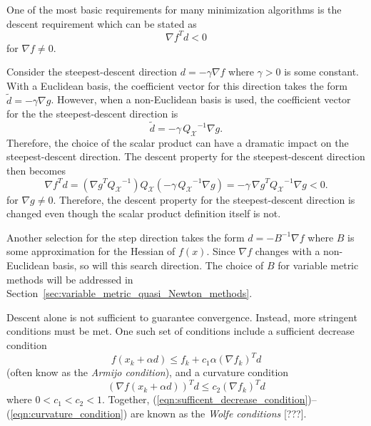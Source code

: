 \documentclass[pdf,ps2pdf,11pt]{SANDreport}
\begin{document}
One of the most basic requirements for many minimization algorithms is the
descent requirement which can be stated as
%
\begin{equation}
{\nabla f}^T d < 0
\label{eqn:descent_condition}
\end{equation}
%
for $\nabla f {}\ne 0$.

Consider the steepest-descent direction $d = -{}\gamma\nabla f$ where $\gamma
>0$ is some constant.  With a Euclidean basis, the coefficient vector for this
direction takes the form $\tilde{d} = -{}\gamma\nabla g$.  However, when a
non-Euclidean basis is used, the coefficient vector for the the
steepest-descent direction is
%
\[
\tilde{d} = - \gamma \, {Q_{\mathcal{X}}}^{-1} \nabla g. 
\]
%
Therefore, the choice of the scalar product can have a dramatic impact on the
steepest-descent direction.  The descent property for the steepest-descent direction then
becomes
%
\[
{\nabla f}^T d
= ( {\nabla g}^T {Q_{\mathcal{X}}}^{-1}) Q_{\mathcal{X}} (-\gamma\,{Q_{\mathcal{X}}}^{-1} \nabla g)
= -\gamma\,{\nabla g}^T {Q_{\mathcal{X}}}^{-1} \nabla g < 0.
\]
%
for $\nabla g {}\ne 0$.  Therefore, the descent property for the
steepest-descent direction is changed even though the scalar product
definition itself is not.

Another selection for the step direction takes the form $d = - B^{-1} {}\nabla
f$ where $B$ is some approximation for the Hessian of $f(x)$.  Since ${}\nabla
f$ changes with a non-Euclidean basis, so will this search direction.  The
choice of $B$ for variable metric methods will be addressed in
Section~\ref{sec:variable_metric_quasi_Newton_methods}.

Descent alone is not sufficient to guarantee convergence.  Instead, more
stringent conditions must be met.  One such set of conditions include a
sufficient decrease condition
%
\begin{equation}
f(x_k + \alpha d) \le f_k + c_1 \alpha (\nabla f_k)^T d
\label{eqn:sufficent_decrease_condition}
\end{equation}
%
(often know as the {}\textit{Armijo condition}), and a curvature condition
%
\begin{equation}
(\nabla f(x_k + \alpha d))^T d \le c_2 (\nabla f_k)^T d
\label{eqn:curvature_condition}
\end{equation}
%
where $0 < c_1 < c_2 < 1$.  Together,
(\ref{eqn:sufficent_decrease_condition})--(\ref{eqn:curvature_condition}) are
known as the {}\textit{Wolfe conditions} [???].
\end{document}
